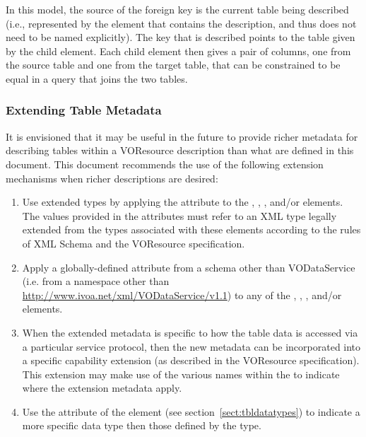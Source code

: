 \documentclass[11pt,a4paper]{ivoa}
\begin{document}


In this model, the source of the foreign
key is the current table being described (i.e., represented by the
 element that contains the
 description, and thus does not need to be
named explicitly).  The key that is described points to the table
given by the  child element.  Each child
 element then gives a pair of columns, one
from the source table and one from the target table, that can be
constrained to be equal in a query that joins the two tables.  






\subsubsection{Extending Table Metadata}
\label{sect:tblext}

It is envisioned that it may be useful in the future to provide richer
metadata for describing tables within a VOResource description than
what are defined in this document.  This document recommends the
use of the following extension mechanisms when richer descriptions are
desired:

\begin{enumerate}
\item Use extended types by applying the 
       attribute to the ,
       , , 
        and/or
        elements.  The values provided in the
       attributes must refer to an XML type legally extended from the types
       associated with these elements according to the rules of XML Schema
       \citep{std:XSD} and the VOResource specification.

\item Apply a globally-defined attribute from a schema other than
       VODataService (i.e. from a namespace other than
       \url{http://www.ivoa.net/xml/VODataService/v1.1}) to any of the
       , ,
       , and/or 
       elements.

\item When the extended metadata is specific to how the table data is
       accessed via a particular service protocol, then the new
       metadata can be incorporated into a specific capability
       extension (as described in the VOResource specification).  
       This extension may make use of the
       various names within the  to
       indicate where the extension metadata apply.

\item Use the  attribute of the
        element (see 
       section~\ref{sect:tbldatatypes})
       to indicate a more specific data type then those defined by the
        type.
\end{enumerate}
\end{document}
